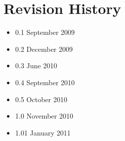 \documentclass[11pt]{article}
\begin{document}
\section*{Revision History}
\begin{itemize}
\item 0.1 September 2009
\item 0.2 December 2009
\item 0.3 June 2010
\item 0.4 September 2010
\item 0.5 October 2010
\item 1.0 November 2010
\item 1.01 January 2011
\end{itemize}



\end{document}
